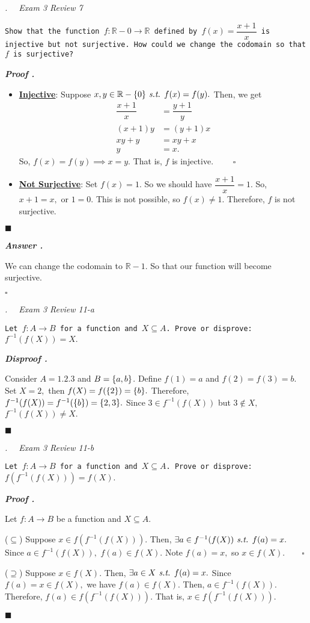 \documentclass[11pt,letter]{article}
\newcounter{nq}[section]
\newcounter{np}[section]
\newenvironment*{p}{\par\noindent\textbf{\textit{Proof \stepcounter{np}\thenp. }}\par}{\par\hfill $\blacksquare$\par}
\newenvironment*{dis}{\par\noindent\textbf{\textit{Disproof \stepcounter{np}\thenp. }}\par}{\par\hfill $\blacksquare$\par}
\newenvironment*{q}[1]{\noindent\emph{\thesection.\stepcounter{nq}\thenq$\quad $ #1}\par\noindent\texttt}{}
\newenvironment*{ans}{\par\noindent\textbf{\textit{Answer \stepcounter{np}\thenp. }}\par}{\par\hfill $\square$\par}
\def\R{{\mathbb{R}}}
\def\st{\emph{ s.t. }}
\def\f{f^{-1}}
\begin{document}
\begin{framed}\begin{q}
	{Exam 3 Review 7}
	{Show that the function $f:\R-\qty{0}\to\R$ defined by $f(x)=\dfrac{x+1}{x}$ is injective but not surjective. How could we change the codomain so that $f$ is surjective?}
\end{q}\end{framed}
\begin{p}
	\begin{itemize}
		\item \underline{\textbf{Injective}}: Suppose $x,y\in\R-\qty{0}\st f(x)=f(y).$ Then, we get \[\begin{aligned}\dfrac{x+1}{x}&=\dfrac{y+1}{y}\\(x+1)y&=(y+1)x\\xy+y&=xy+x\\y&=x.\end{aligned}\] So, $f(x)=f(y)\implies x=y.$ That is, $f$ is injective. $\qquad\square$
		\item \underline{\textbf{Not Surjective}}: Set $f(x)=1.$ So we should have $\dfrac{x+1}{x}=1.$ So, $x+1=x,$ or $1=0.$ This is not possible, so $f(x)\neq1.$ Therefore, $f$ is not surjective.
	\end{itemize}
\end{p}
\begin{ans}
	We can change the codomain to $\R-\qty{1}.$ So that our function will become surjective. 
\end{ans}

\begin{framed}\begin{q}
	{Exam 3 Review 11-a}
	{Let $f:A\to B$ for a function and $X\subseteq A$. Prove or disprove: $\f(f(X))=X.$}
\end{q}\end{framed}
\begin{dis}
	Consider $A=\qty{1,2,3}$ and $B=\qty{a,b}$. Define $f(1)=a$ and $f(2)=f(3)=b.$ Set $X=\qty{2},$ then $f(X)=f(\qty{2})=\qty{b}.$ Therefore, $\f(f(X))=\f(\qty{b})=\qty{2,3}.$ Since $3\in\f(f(X))$ but $3\notin X,$ $\f(f(X))\neq X.$
\end{dis}

\begin{framed}\begin{q}
	{Exam 3 Review 11-b}
	{Let $f:A\to B$ for a function and $X\subseteq A$. Prove or disprove: $f(\f(f(X)))=f(X).$}
\end{q}\end{framed}
\begin{p}
	Let $f:A\to B$ be a function and $X\subseteq A.$\par 
	($\subseteq$) Suppose $x\in f(\f(f(X))).$ Then, $\exists a\in\f(f(X))\st f(a)=x.$ Since $a\in\f(f(X)),$ $f(a)\in f(X).$ Note $f(a)=x,$ so $x\in f(X).\qquad\square$\par 
	($\supseteq$) Suppose $x\in f(X).$ Then, $\exists a\in X\st f(a)=x.$ Since $f(a)=x\in f(X),$ we have $f(a)\in f(X).$ Then, $a\in\f(f(X)).$ Therefore, $f(a)\in f(\f(f(X))).$ That is, $x\in f(\f(f(X))).$
\end{p}
\end{document}
